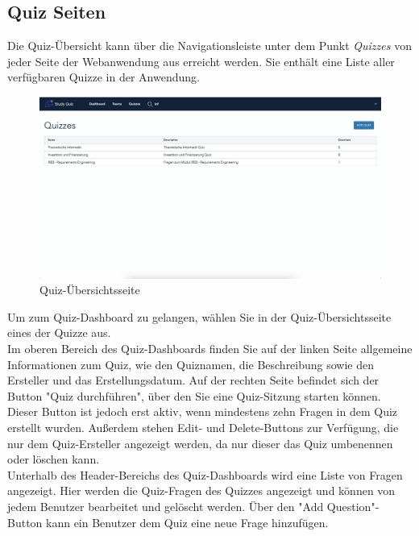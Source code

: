 \subsection*{Quiz Seiten}

Die Quiz-Übersicht kann über die Navigationsleiste unter dem Punkt \textit{Quizzes} 
von jeder Seite der Webanwendung aus erreicht werden. Sie enthält eine Liste aller verfügbaren 
Quizze in der Anwendung.

\begin{figure}[H]
  \includegraphics[width=\linewidth]{img/quiz-list.png}
  \caption{Quiz-Übersichtsseite}
  \label{fig:quiz}
\end{figure}

\noindent Um zum Quiz-Dashboard zu gelangen, wählen Sie in der Quiz-Übersichtsseite eines der Quizze aus. \\

\noindent Im oberen Bereich des Quiz-Dashboards finden Sie auf der linken Seite allgemeine Informationen 
zum Quiz, wie den Quiznamen, die Beschreibung sowie den Ersteller und das Erstellungsdatum. 
Auf der rechten Seite befindet sich der Button "Quiz durchführen", über den Sie eine Quiz-Sitzung 
starten können. Dieser Button ist jedoch erst aktiv, wenn mindestens zehn Fragen in dem Quiz erstellt 
wurden. Außerdem stehen Edit- und Delete-Buttons zur Verfügung, die nur dem Quiz-Ersteller angezeigt 
werden, da nur dieser das Quiz umbenennen oder löschen kann. \\

\noindent Unterhalb des Header-Bereichs des Quiz-Dashboards wird eine Liste von Fragen angezeigt. 
Hier werden die Quiz-Fragen des Quizzes angezeigt und können von jedem Benutzer bearbeitet
und gelöscht werden. Über den "Add Question"-Button kann ein Benutzer dem Quiz eine neue Frage hinzufügen. \\

